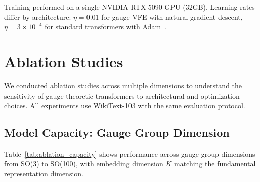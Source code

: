 \documentclass[twoside,11pt]{article}
\begin{document}
Training performed on a single NVIDIA RTX 5090 GPU (32GB). Learning rates differ by architecture: $\eta = 0.01$ for gauge VFE with natural gradient descent, $\eta = 3 \times 10^{-4}$ for standard transformers with Adam~\citep{kingma2014adam}.

\section{Ablation Studies}
\label{app:ablations}

We conducted ablation studies across multiple dimensions to understand the sensitivity of gauge-theoretic transformers to architectural and optimization choices. All experiments use WikiText-103 with the same evaluation protocol.

\subsection{Model Capacity: Gauge Group Dimension}

Table~\ref{tab:ablation_capacity} shows performance across gauge group dimensions from SO(3) to SO(100), with embedding dimension $K$ matching the fundamental representation dimension.
\end{document}

